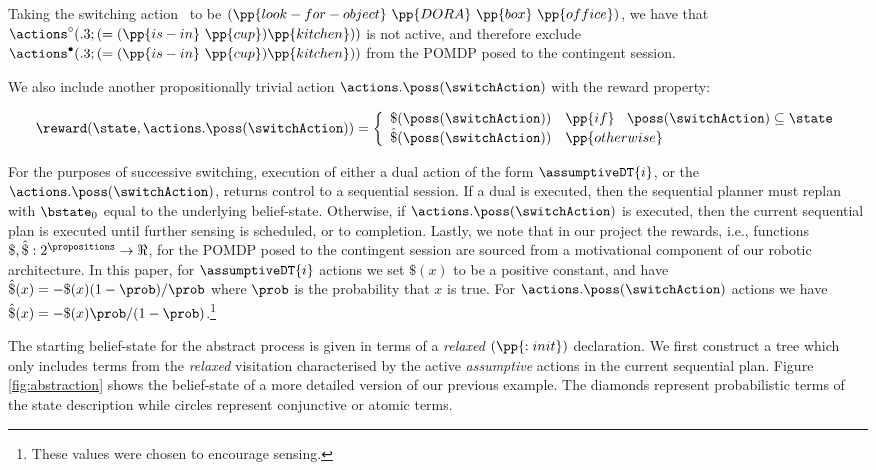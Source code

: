 \noindent Taking the switching action \switchAction\ to be
$(\pp{look-for-object}~\pp{DORA}~\pp{box}~\pp{office})$, we have that
$\actions^{\circ}(.3;(=(\pp{is-in}~\pp{cup})\pp{kitchen}))$ is not
active, and therefore exclude
$\actions^{\bullet}(.3;(=(\pp{is-in}~\pp{cup})\pp{kitchen}))$ from the
POMDP posed to the contingent session. 

We also include another propositionally trivial action
$\actions.\poss(\switchAction)$ with the reward property:

\[
\reward(\state, \actions.\poss(\switchAction)) = \bigg\{ \begin{array}{ll}
\$(\poss(\switchAction)) & \pp{if}~\;\; \poss(\switchAction) \subseteq \state \\
\hat\$(\poss(\switchAction)) & \pp{otherwise} \\
\end{array}
\]

For the purposes of successive switching, execution of either a dual
action of the form $\assumptiveDT{i}$, or the
$\actions.\poss(\switchAction)$, returns control to a sequential
session. If a dual is executed, then the sequential planner must
replan with $\bstate_0$ equal to the underlying
belief-state. Otherwise, if $\actions.\poss(\switchAction)$ is
executed, then the current sequential plan is executed until further
sensing is scheduled, or to completion. Lastly, we note that in our
project the rewards, i.e., functions
$\$,\hat\$:2^\propositions\to\Re$, for the POMDP posed to the
contingent session are sourced from a motivational component of our
robotic architecture. In this paper, for $\assumptiveDT{i}$ actions we
set $\$(x)$ to be a positive constant, and have $\hat\$(x)= - \$(x)(1
- \prob) / \prob$ where $\prob$ is the probability that $x$ is true. For
$\actions.\poss(\switchAction)$ actions we have $\hat\$(x)= -
\$(x)\prob/(1-\prob)$.\footnote{These values were chosen to encourage
  sensing.}


The starting belief-state for the abstract process is given in terms
of a {\em relaxed} $(\pp{:init})$ declaration. We first construct a
tree which only includes terms from the {\em relaxed} visitation
characterised by the active {\em assumptive} actions in the current
sequential plan. Figure \ref{fig:abstraction} shows the belief-state
of a more detailed version of our previous example. The diamonds
represent probabilistic terms of the state description while circles
represent conjunctive or atomic terms. 

